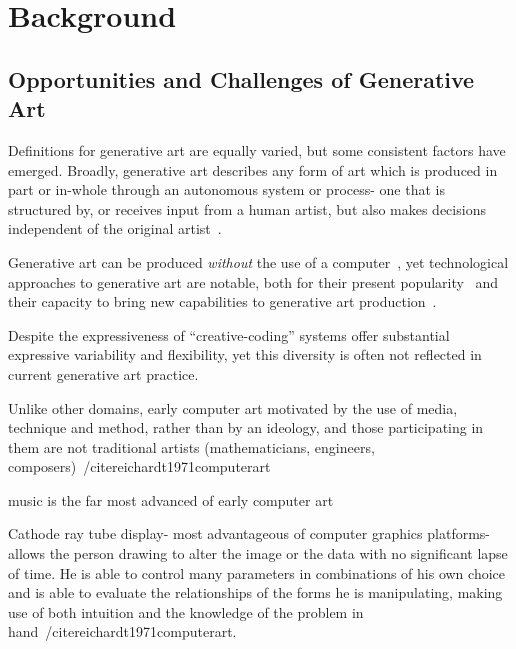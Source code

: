 \documentclass{sigchi}
\begin{document}


\section{Background}
\subsection{Opportunities and Challenges of Generative Art}
 Definitions for generative art are equally varied, but some consistent factors have emerged. Broadly, generative art describes any form of art which is produced in part or in-whole through an autonomous system or process- one that is structured by, or receives input from a human artist, but also makes decisions independent of the original artist~\cite{Galanter03whatis}. 
 
 Generative art can be produced \textit{without} the use of a computer~\cite{boden}, yet technological approaches to generative art are notable, both for their present popularity~\cite{doi:10.1080/14626268.2012.709940} and their capacity to bring new capabilities to generative art production~\cite{doi:10.1162LEONa00533}.
 
 Despite the expressiveness of  ``creative-coding''  systems offer substantial  expressive variability and flexibility, yet this diversity is often not reflected in current generative art practice.
 
 Unlike other domains, early computer art motivated by the use of media, technique and method, rather than by an ideology, and those participating in them are not traditional artists (mathematicians, engineers, composers)~/cite{reichardt1971computerart}
 
 music is the far most advanced of early computer art~\cite{reichardt1971computerart}
 
 Cathode ray tube display- most advantageous of computer graphics platforms- allows the person drawing to alter the image or the data with no significant lapse of time. He is able to control many parameters in combinations of his own choice and is able to evaluate the relationships of the forms he is manipulating, making use of both intuition and the knowledge of the problem in hand~/cite{reichardt1971computerart}.
 
\end{document}
